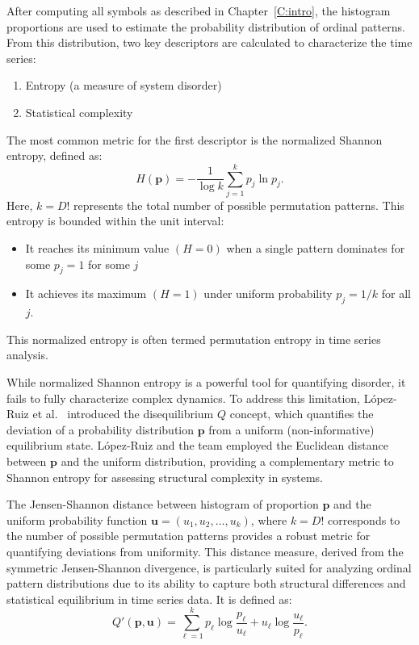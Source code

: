 After computing all symbols as described in Chapter~\ref{C:intro}, the histogram proportions are used to estimate the probability distribution of ordinal patterns. 
From this distribution, two key descriptors are calculated to characterize the time series:
\begin{enumerate}
	\item Entropy (a measure of system disorder)
	
	\item Statistical complexity
\end{enumerate}
The most common metric for the first descriptor is the normalized Shannon entropy, defined as:
\begin{equation}
	H(\mathbf{p})=-\dfrac{1}{\log k}\sum^{k}_{j=1}p_j \ln{p_j}.
\end{equation}
Here, $k=D!$ represents the total number of possible permutation patterns.
This entropy is bounded within the unit interval:
\begin{itemize}
	\item It reaches its minimum value $(H=0)$ when a single pattern dominates  for some $p_j=1$ for some $j$ 
	\item It achieves its maximum $(H=1)$ under uniform probability $p_j=1/k$ for all $j$. 
\end{itemize}
This normalized entropy is often termed permutation entropy in time series analysis. 

While normalized Shannon entropy is a powerful tool for quantifying disorder, it fails to fully characterize complex dynamics. To address this limitation, López-Ruiz et al.~\cite{lopez1995statistical} introduced the disequilibrium $Q$ concept, which quantifies the deviation of a probability distribution $\mathbf{p}$ from a uniform (non-informative) equilibrium state. 
López-Ruiz and the team employed the Euclidean distance between $\mathbf{p}$ and the uniform distribution, providing a complementary metric to Shannon entropy for assessing structural complexity in systems.

The Jensen-Shannon distance between histogram of proportion $\mathbf{p}$ and the uniform probability function $\mathbf{u}=(u_1,u_2,\dots, u_k)$, where $k=D!$ corresponds to the number of possible permutation patterns provides a robust metric for quantifying deviations from uniformity. This distance measure, derived from the symmetric Jensen-Shannon divergence, is particularly suited for analyzing ordinal pattern distributions due to its ability to capture both structural differences and statistical equilibrium in time series data.
It is defined as:
\begin{equation}
	Q'(\mathbf{p,u})=\sum^k_{\ell=1} p_\ell\log\dfrac{p_\ell}{u_\ell}+u_\ell\log\dfrac{u_\ell}{p_\ell}.
\end{equation}

